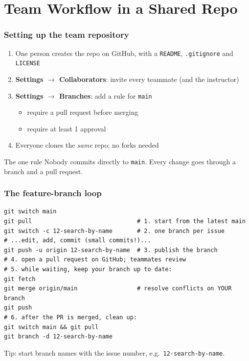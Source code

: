 \documentclass[aspectratio=169,10pt,compress]{beamer}
\begin{document}
\section[Teamwork]{Team Workflow in a Shared Repo}

\begin{frame}[t,fragile] \frametitle{Setting up the team repository}
  \begin{enumerate}
    \item One person creates the repo on GitHub, with a \texttt{README}, \texttt{.gitignore} and \texttt{LICENSE}
    \item \textbf{Settings $\rightarrow$ Collaborators}: invite every teammate (and the instructor)
    \item \textbf{Settings $\rightarrow$ Branches}: add a rule for \texttt{main}
      \begin{itemize}\small
        \item require a pull request before merging
        \item require at least 1 approval
      \end{itemize}
    \item Everyone clones the \emph{same} repo; no forks needed
  \end{enumerate}

  \vspace{0.5em}
  \begin{block}{The one rule}
    Nobody commits directly to \texttt{main}. Every change goes through a branch and a pull request.
  \end{block}
\end{frame}

\begin{frame}[t,fragile] \frametitle{The feature-branch loop}
\begin{lstlisting}
git switch main
git pull                              # 1. start from the latest main
git switch -c 12-search-by-name       # 2. one branch per issue
# ...edit, add, commit (small commits!)...
git push -u origin 12-search-by-name  # 3. publish the branch
# 4. open a pull request on GitHub; teammates review
# 5. while waiting, keep your branch up to date:
git fetch
git merge origin/main                 # resolve conflicts on YOUR branch
git push
# 6. after the PR is merged, clean up:
git switch main && git pull
git branch -d 12-search-by-name
\end{lstlisting}
  \small Tip: start branch names with the issue number, e.g.\ \texttt{12-search-by-name}.
\end{frame}
\end{document}
